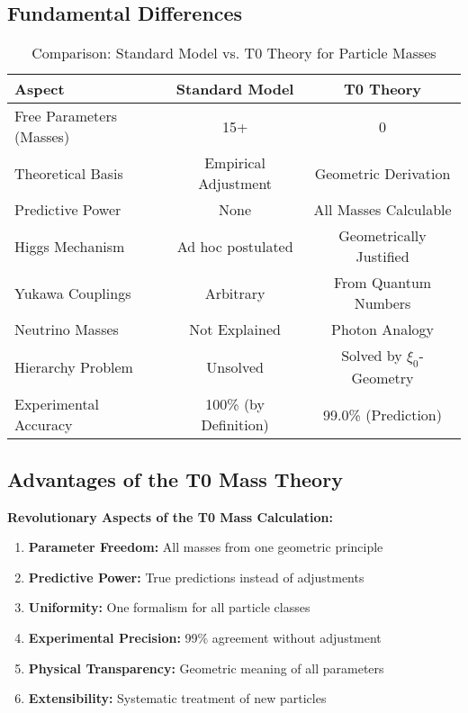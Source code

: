 \documentclass[12pt,a4paper]{article}
\begin{document}
	\subsection{Fundamental Differences}
	
	\begin{table}[h]
		\centering
		\begin{tabular}{lcc}
			\toprule
			\textbf{Aspect} & \textbf{Standard Model} & \textbf{T0 Theory} \\
			\midrule
			Free Parameters (Masses) & 15+ & 0 \\
			Theoretical Basis & Empirical Adjustment & Geometric Derivation \\
			Predictive Power & None & All Masses Calculable \\
			Higgs Mechanism & Ad hoc postulated & Geometrically Justified \\
			Yukawa Couplings & Arbitrary & From Quantum Numbers \\
			Neutrino Masses & Not Explained & Photon Analogy \\
			Hierarchy Problem & Unsolved & Solved by $\xi_0$-Geometry \\
			Experimental Accuracy & 100\% (by Definition) & 99.0\% (Prediction) \\
			\bottomrule
		\end{tabular}
		\caption{Comparison: Standard Model vs. T0 Theory for Particle Masses}
	\end{table}
	
	\subsection{Advantages of the T0 Mass Theory}
	
	\begin{keyresult}
		\textbf{Revolutionary Aspects of the T0 Mass Calculation:}
		
		\begin{enumerate}
			\item \textbf{Parameter Freedom:} All masses from one geometric principle
			
			\item \textbf{Predictive Power:} True predictions instead of adjustments
			
			\item \textbf{Uniformity:} One formalism for all particle classes
			
			\item \textbf{Experimental Precision:} 99\% agreement without adjustment
			
			\item \textbf{Physical Transparency:} Geometric meaning of all parameters
			
			\item \textbf{Extensibility:} Systematic treatment of new particles
		\end{enumerate}
	\end{keyresult}
	
\end{document}
